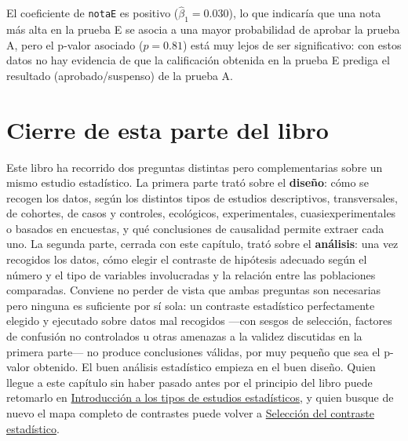 \documentclass[
  spanish,
  a4paper,
]{scrreport}
\theoremstyle{definition}
\theoremstyle{definition}
\theoremstyle{remark}
\begin{document}
El coeficiente de \texttt{notaE} es positivo (\(\hat\beta_1 = 0.030\)),
lo que indicaría que una nota más alta en la prueba E se asocia a una
mayor probabilidad de aprobar la prueba A, pero el p-valor asociado
(\(p = 0.81\)) está muy lejos de ser significativo: con estos datos no
hay evidencia de que la calificación obtenida en la prueba E prediga el
resultado (aprobado/suspenso) de la prueba A.

\section{Cierre de esta parte del
libro}\label{cierre-de-esta-parte-del-libro}

Este libro ha recorrido dos preguntas distintas pero complementarias
sobre un mismo estudio estadístico. La primera parte trató sobre el
\textbf{diseño}: cómo se recogen los datos, según los distintos tipos de
estudios descriptivos, transversales, de cohortes, de casos y controles,
ecológicos, experimentales, cuasiexperimentales o basados en encuestas,
y qué conclusiones de causalidad permite extraer cada uno. La segunda
parte, cerrada con este capítulo, trató sobre el \textbf{análisis}: una
vez recogidos los datos, cómo elegir el contraste de hipótesis adecuado
según el número y el tipo de variables involucradas y la relación entre
las poblaciones comparadas. Conviene no perder de vista que ambas
preguntas son necesarias pero ninguna es suficiente por sí sola: un
contraste estadístico perfectamente elegido y ejecutado sobre datos mal
recogidos ---con sesgos de selección, factores de confusión no
controlados u otras amenazas a la validez discutidas en la primera
parte--- no produce conclusiones válidas, por muy pequeño que sea el
p-valor obtenido. El buen análisis estadístico empieza en el buen
diseño. Quien llegue a este capítulo sin haber pasado antes por el
principio del libro puede retomarlo en
\hyperref[introducciuxf3n-a-los-tipos-de-estudios-estaduxedsticos]{Introducción
a los tipos de estudios estadísticos}, y quien busque de nuevo el mapa
completo de contrastes puede volver a
\hyperref[selecciuxf3n-del-contraste-estaduxedstico-1]{Selección del
contraste estadístico}.
\end{document}
